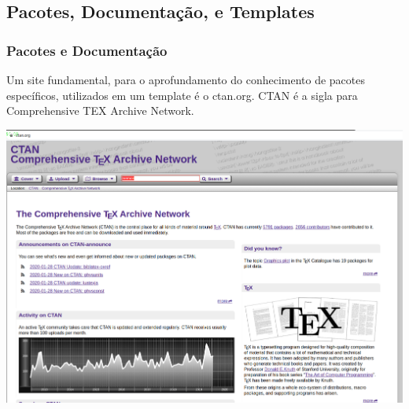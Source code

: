 \documentclass{beamer}
\begin{document}
\begin{frame}

  \section{Pacotes, Documentação, e Templates}
  \frametitle{Pacotes e Documentação}
  \begin{tcolorbox}[fontupper=\fontsize{4mm}{4mm}, size=small, sharp
    corners=downhill, colback=red!5!white,colframe=red!75!black]
  Um site fundamental, para o aprofundamento do conhecimento de
  pacotes específicos, utilizados em um
  template é o ctan.org. CTAN é a sigla para Comprehensive TEX Archive
  Network.
  \end{tcolorbox}
  \begin{center}
    \includegraphics[scale=0.16]{../Imagens/CTAN2.png}
  \end{center}

\end{frame}
\end{document}
